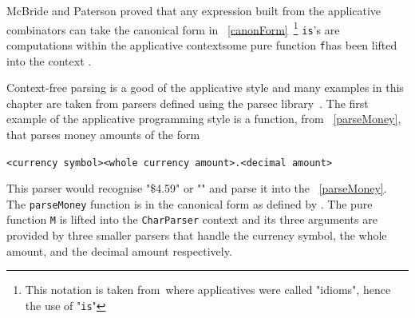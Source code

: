 McBride and Paterson proved that any expression built from the applicative combinators can take the \DIFdelbegin {}\DIFdelend canonical form in \DIFdelbegin {}\DIFdelend \DIFaddbegin {}\DIFaddend ~\ref{canonForm}~\DIFdelbegin {}\DIFdelend \DIFaddbegin {}\DIFaddend \footnote{This notation is taken from~\DIFdelbegin {}\DIFdelend \DIFaddbegin {}\DIFaddend where applicatives were called "idioms", hence the use of "\texttt{is}"\DIFaddbegin {}\DIFaddend } \DIFdelbegin {}\DIFdelend \DIFaddbegin {}\DIFaddend \texttt{is}'s \DIFaddbegin {}\DIFaddend are computations within the applicative context\DIFdelbegin {}\DIFdelend \DIFaddbegin {}\DIFaddend some pure function \DIFaddbegin {}\DIFaddend \texttt{f}\DIFdelbegin {}\DIFdelend \DIFaddbegin {}\DIFaddend has been lifted into the context \DIFaddbegin {}\texttt{} \DIFaddend . 

Context-free parsing is a good \DIFdelbegin {}\DIFdelend \DIFaddbegin {}\DIFaddend of the applicative style and many examples in this chapter are taken from parsers defined using the parsec library~\DIFdelbegin {}\DIFdelend \DIFaddbegin {}\DIFaddend . The first example of the applicative programming style is a function, from \DIFdelbegin {}\DIFdelend \DIFaddbegin {}\DIFaddend ~\ref{parseMoney}, that parses money amounts of the form\DIFaddbegin \DIFadd{:
 }

 \DIFaddend \texttt{<currency symbol><whole currency amount>.<decimal amount>}
  \DIFdelbegin {}\DIFdelend \DIFaddbegin 

\DIFaddend This parser would recognise "\$4.59" or "" and parse it into the \DIFdelbegin {}\DIFdelend \DIFaddbegin \texttt{} \DIFaddend ~\ref{parseMoney}. The \texttt{parseMoney} function is in the canonical form as defined by \DIFdelbegin {}\DIFdelend \DIFaddbegin {}\DIFaddend . The pure function \texttt{M} is lifted into the \texttt{CharParser} context and its three arguments are provided by three smaller parsers that handle the currency symbol, the whole amount, and the decimal amount respectively. 


